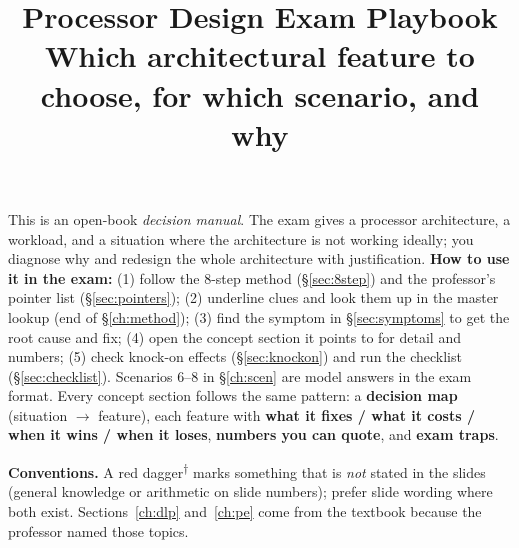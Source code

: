 \documentclass[9pt,a4paper]{extarticle}
\title{\LARGE\bfseries Processor Design Exam Playbook\\[2pt]
\normalsize Which architectural feature to choose, for which scenario, and why}
\author{}
\date{}
\newcommand{\bs}{\textsuperscript{\textcolor{avoidc}{$\dagger$}}}
\begin{document}
\maketitle

\begin{center}\begin{minipage}{0.95\textwidth}\small
\noindent This is an open-book \emph{decision manual}. The exam gives a processor architecture, a workload, and a situation where the architecture is not working ideally; you diagnose why and redesign the whole architecture with justification. \textbf{How to use it in the exam:} (1) follow the 8-step method (\S\ref{sec:8step}) and the professor's pointer list (\S\ref{sec:pointers}); (2) underline clues and look them up in the master lookup (end of \S\ref{ch:method}); (3) find the symptom in \S\ref{sec:symptoms} to get the root cause and fix; (4) open the concept section it points to for detail and numbers; (5) check knock-on effects (\S\ref{sec:knockon}) and run the checklist (\S\ref{sec:checklist}). Scenarios 6--8 in \S\ref{ch:scen} are model answers in the exam format.
Every concept section follows the same pattern: a \textbf{decision map} (situation $\rightarrow$ feature), each feature with \textbf{what it fixes / what it costs / when it wins / when it loses}, \textbf{numbers you can quote}, and \textbf{exam traps}.

\medskip
\noindent\textbf{Conventions.}
A red dagger\bs{} marks something that is \emph{not} stated in the slides (general knowledge or arithmetic on slide numbers); prefer slide wording where both exist. Sections~\ref{ch:dlp} and~\ref{ch:pe} come from the textbook because the professor named those topics.
\end{minipage}\end{center}














\end{document}
